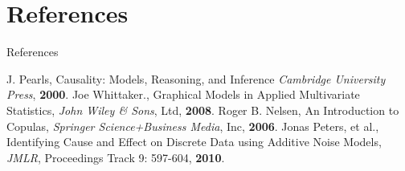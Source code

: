 \documentclass{beamer}
\begin{document}
\section{References}
\begin{frame}{References}
\begin{thebibliography}{99}
 J. Pearls,  Causality: Models, Reasoning, and Inference  \textit{Cambridge University Press}, \textbf{2000}.
 Joe Whittaker., Graphical Models in Applied Multivariate Statistics, \textit{John Wiley \& Sons}, Ltd, \textbf{2008}.
 Roger B. Nelsen, An Introduction to Copulas, \textit{Springer Science+Business Media}, Inc, \textbf{2006}.
 Jonas Peters, et al., Identifying Cause and Effect on Discrete Data using Additive Noise Models, \textit{JMLR}, Proceedings Track 9: 597-604, \textbf{2010}.
\end{thebibliography}
\end{frame}
\end{document}
